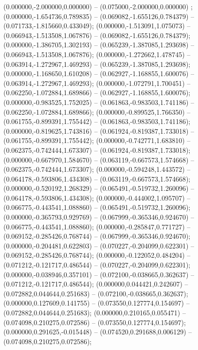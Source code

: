  (0.000000,-2.000000,0.000000) -- (0.075000,-2.000000,0.000000) ;
 (0.000000,-1.654736,0.789835) -- (0.069082,-1.655126,0.784379) -- (0.071733,-1.815660,0.433049);
 (0.000000,-1.513091,1.075073) -- (0.066943,-1.513508,1.067876) -- (0.069082,-1.655126,0.784379);
 (0.000000,-1.386705,1.302193) -- (0.065239,-1.387085,1.293698) -- (0.066943,-1.513508,1.067876);
 (0.000000,-1.272662,1.478745) -- (0.063914,-1.272967,1.469293) -- (0.065239,-1.387085,1.293698);
 (0.000000,-1.168650,1.610208) -- (0.062927,-1.168855,1.600076) -- (0.063914,-1.272967,1.469293);
 (0.000000,-1.072791,1.700451) -- (0.062250,-1.072884,1.689866) -- (0.062927,-1.168855,1.600076);
 (0.000000,-0.983525,1.752025) -- (0.061863,-0.983503,1.741186) -- (0.062250,-1.072884,1.689866);
 (0.000000,-0.899525,1.766350) -- (0.061755,-0.899391,1.755442) -- (0.061863,-0.983503,1.741186);
 (0.000000,-0.819625,1.743816) -- (0.061924,-0.819387,1.733018) -- (0.061755,-0.899391,1.755442);
 (0.000000,-0.742771,1.683810) -- (0.062375,-0.742444,1.673307) -- (0.061924,-0.819387,1.733018);
 (0.000000,-0.667970,1.584670) -- (0.063119,-0.667573,1.574668) -- (0.062375,-0.742444,1.673307);
 (0.000000,-0.594248,1.443572) -- (0.064178,-0.593806,1.434308) -- (0.063119,-0.667573,1.574668);
 (0.000000,-0.520192,1.268329) -- (0.065491,-0.519732,1.260096) -- (0.064178,-0.593806,1.434308);
 (0.000000,-0.444002,1.095707) -- (0.066775,-0.443541,1.088860) -- (0.065491,-0.519732,1.260096);
 (0.000000,-0.365793,0.929769) -- (0.067999,-0.365346,0.924670) -- (0.066775,-0.443541,1.088860);
 (0.000000,-0.285847,0.771727) -- (0.069152,-0.285426,0.768744) -- (0.067999,-0.365346,0.924670);
 (0.000000,-0.204481,0.622803) -- (0.070227,-0.204099,0.622301) -- (0.069152,-0.285426,0.768744);
 (0.000000,-0.122052,0.484204) -- (0.071212,-0.121717,0.486544) -- (0.070227,-0.204099,0.622301);
 (0.000000,-0.038946,0.357101) -- (0.072100,-0.038665,0.362637) -- (0.071212,-0.121717,0.486544);
 (0.000000,0.044421,0.242607) -- (0.072882,0.044644,0.251683) -- (0.072100,-0.038665,0.362637);
 (0.000000,0.127609,0.141755) -- (0.073550,0.127774,0.154697) -- (0.072882,0.044644,0.251683);
 (0.000000,0.210165,0.055471) -- (0.074098,0.210275,0.072586) -- (0.073550,0.127774,0.154697);
 (0.000000,0.291625,-0.015448) -- (0.074520,0.291688,0.006129) -- (0.074098,0.210275,0.072586);
